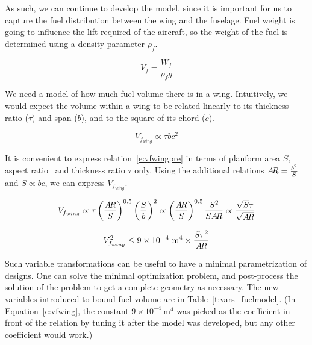 As such, we can continue to develop the model, since it is important for us to
capture the fuel distribution between the wing and the fuselage. Fuel weight is going
to influence the lift required of the aircraft, so the weight of the fuel is determined
using a density parameter $\rho_{f}$. 

\begin{equation}
    V_f = \frac{W_f } {\rho_f g}
    \label{e:vf}
\end{equation}

We need a model of how much fuel volume there is in a wing. Intuitively,
we would expect the volume within a wing
to be related linearly to its thickness ratio ($\tau$) and span ($b$),
and to the square of its chord ($c$). 

\begin{equation}
	V_{f_{wing}} \propto \tau b c^2
	\label{e:vfwingpre}
\end{equation} 

It is convenient to express relation~\ref{e:vfwingpre} in terms of planform area $S$,
aspect ratio \AR~and thickness ratio $\tau$ only.
Using the additional relations $A\!R = \frac{b^2}{S}$ and $S \propto b c$, we can
express $V_{f_{wing}}$.

\begin{equation}
	V_{f_{wing}} \propto \tau \left(\frac{A\!R}{S}\right)^{0.5} \left(\frac{S}{b}\right)^2 \propto
		\left(\frac{A\!R}{S}\right)^{0.5} \frac{S^2}{S A\!R} \propto \frac{\sqrt{S}\tau}{\sqrt{A\!R}}
\end{equation}

\begin{equation}
\label{e:vfwing}
V_{f_{wing}}^2 \leq 9\times10^{-4} ~\mathrm{m}^4 \times \frac{S \tau^2}{A\!R}
\end{equation}

Such variable transformations can be useful to have a minimal parametrization of designs.
One can solve the minimal optimization problem, and
post-process the solution of the problem to get a complete geometry
as necessary. The new variables introduced to bound fuel volume are in Table~\ref{t:vars_fuelmodel}.
(In Equation~\ref{e:vfwing}, the constant $9\times10^{-4}~\mathrm{m}^4$ was picked as the coefficient in
front of the relation by tuning it after the model was developed,
but any other coefficient would work.)

